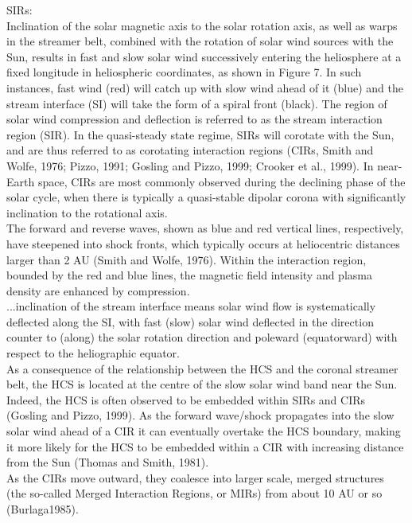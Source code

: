 \citet{Owens2013} SIRs:\\
Inclination of the solar magnetic axis to the solar rotation axis, as well as warps in the streamer belt, combined with the rotation of solar wind sources with the Sun, results in fast and slow solar wind successively entering the heliosphere at a fixed longitude in heliospheric coordinates, as shown in Figure 7. In such instances, fast wind (red) will catch up with slow wind ahead of it (blue) and the stream interface (SI) will take the form of a spiral front (black). The region of solar wind compression and deflection is referred to as the stream interaction region (SIR). In the quasi-steady state regime, SIRs will corotate with the Sun, and are thus referred to as corotating interaction regions (CIRs, Smith and Wolfe, 1976; Pizzo, 1991; Gosling and Pizzo, 1999; Crooker et al., 1999). In near-Earth space, CIRs are most commonly observed during the declining phase of the solar cycle, when there is typically a quasi-stable dipolar corona with significantly inclination to the rotational axis.\\
The forward and reverse waves, shown as blue and red vertical lines, respectively, have steepened into shock fronts, which typically occurs at heliocentric distances larger than 2 AU (Smith and Wolfe, 1976). Within the interaction region, bounded by the red and blue lines, the magnetic field intensity and plasma density are enhanced by compression.\\
...inclination of the stream interface means solar wind flow is systematically deflected along the SI, with fast (slow) solar wind deflected in the direction counter to (along) the solar rotation direction and poleward (equatorward) with respect to the heliographic equator.\\
As a consequence of the relationship between the HCS and the coronal streamer belt, the HCS is located at the centre of the slow solar wind band near the Sun. Indeed, the HCS is often observed to be embedded within SIRs and CIRs (Gosling and Pizzo, 1999). As the forward wave/shock propagates into the slow solar wind ahead of a CIR it can eventually overtake the HCS boundary, making it more likely for the HCS to be embedded within a CIR with increasing distance from the Sun (Thomas and Smith, 1981).\\

As the CIRs move outward, they coalesce into larger scale, merged structures (the so-called Merged Interaction Regions, or MIRs) from about 10 AU or so (Burlaga1985).\\


